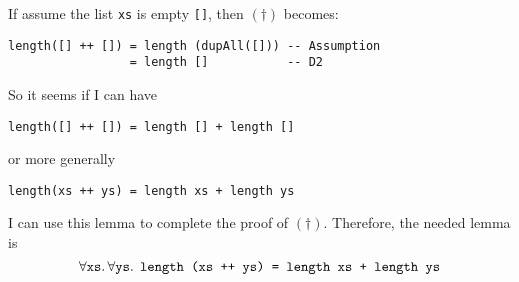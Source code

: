 If assume the list \texttt{xs} is empty \texttt{[]}, then \((\dagger)\) becomes:
\begin{lstlisting}
length([] ++ []) = length (dupAll([])) -- Assumption
                 = length []           -- D2
\end{lstlisting}
So it seems if I can have
\begin{lstlisting}
length([] ++ []) = length [] + length []
\end{lstlisting}
or more generally
\begin{lstlisting}
length(xs ++ ys) = length xs + length ys
\end{lstlisting}
I can use this lemma to complete the proof of \((\dagger)\).  Therefore, the needed lemma is
\[
  \forall\verb|xs|.\,\forall\verb|ys|.\:\:
 \verb|length (xs ++ ys) = length xs + length ys|
\]
